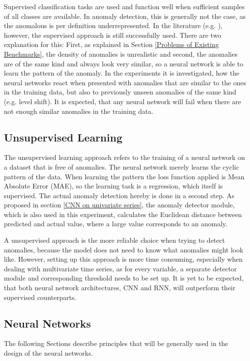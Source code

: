 Supervised classification tasks are used and function well when sufficient samples of all classes are available. In anomaly detection, this is generally not the case, as the anomalous is per definition underrepresented. In the literature (e.g. \parencite{Wen2019}), however, the supervised approach is still successfully used. There are two explanation for this: First, as explained in Section \ref{Problems of Existing Benchmarks}, the density of anomalies is unrealistic and second, the anomalies are of the same kind and always look very similar, so a neural network is able to learn the pattern of the anomaly. In the experiments it is investigated, how the neural networks react when presented with anomalies that are similar to the ones in the training data, but also to previously unseen anomalies of the same kind (e.g. level shift). It is expected, that any neural network will fail when there are not enough similar anomalies in the training data.

\subsection{Unsupervised Learning}
The unsupervised learning approach refers to the training of a neural network on a dataset that is free of anomalies. The neural network merely learns the cyclic pattern of the data. When learning the pattern the loss function applied is Mean Absolute Error (MAE), so the learning task is a regression, which itself is supervised. The actual anomaly detection hereby is done in a second step. As proposed in section \ref{CNN on univariate series}, the anomaly detector module, which is also used in this experiment, calculates the Euclidean distance between predicted and actual value, where a large value corresponds to an anomaly.

A unsupervised approach is the more reliable choice when trying to detect anomalies, because the model does not need to know what anomalies might look like. However, setting up this approach is more time consuming, especially when dealing with multivariate time series, as for every variable, a separate detector module and corresponding threshold needs to be set up. It is yet to be expected, that both neural network architectures, CNN and RNN, will outperform their supervised counterparts. 

\subsection{Neural Networks}
The following Sections describe principles that will be generally used in the design of the neural networks.

